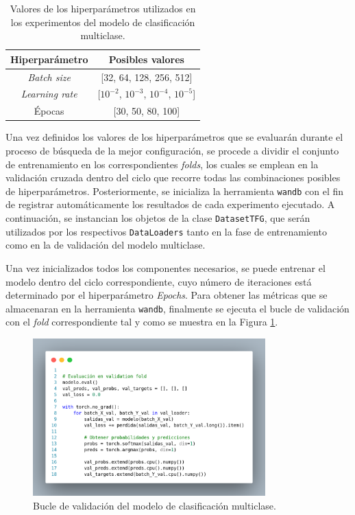 \begin{table}[H]
\centering
\begin{tabular}{|c|c|}
\hline
\textbf{Hiperparámetro} & \textbf{Posibles valores} \\ \hline
\textit{Batch size} & [32, 64, 128, 256, 512] \\ \hline
\textit{Learning rate} & [$10^{-2}$, $10^{-3}$, $10^{-4}$, $10^{-5}$] \\ \hline
Épocas & [30, 50, 80, 100] \\ \hline
\end{tabular}
\caption{Valores de los hiperparámetros utilizados en los experimentos del modelo de clasificación multiclase.}
\label{tab:hiperMUL}
\end{table}


Una vez definidos los valores de los hiperparámetros que se evaluarán durante el proceso de búsqueda de la mejor configuración, se procede a dividir el conjunto de entrenamiento en los correspondientes \textit{folds}, los cuales se emplean en la validación cruzada dentro del ciclo que recorre todas las combinaciones posibles de hiperparámetros. Posteriormente, se inicializa la herramienta \texttt{wandb} con el fin de registrar automáticamente los resultados de cada experimento ejecutado. A continuación, se instancian los objetos de la clase \texttt{DatasetTFG}, que serán utilizados por los respectivos \texttt{DataLoaders} tanto en la fase de entrenamiento como en la de validación del modelo multiclase. 

Una vez inicializados todos los componentes necesarios, se puede entrenar el modelo dentro del ciclo correspondiente, cuyo número de iteraciones está determinado por el hiperparámetro \textit{Epochs}. Para obtener las métricas que se almacenaran en la herramienta \texttt{wandb}, finalmente se ejecuta el bucle de validación con el \textit{fold} correspondiente tal y como se muestra en la Figura  \ref{fig:ValidacionCVMUL}.

\begin{figure}[H]
    \centering
    \includegraphics[width=0.8\textwidth]{./img/modelo/codigo/ValidacionCVMUL.png}
    \caption{Bucle de validación del modelo de clasificación multiclase.}
    \label{fig:ValidacionCVMUL}
\end{figure}




